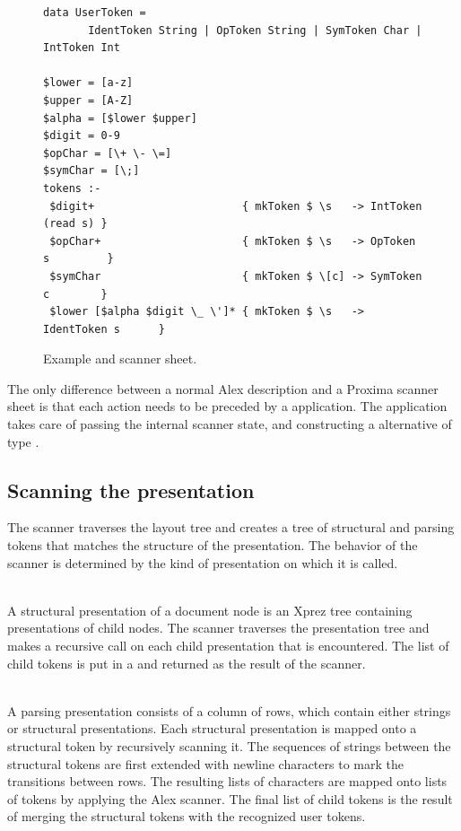 \documentclass[12pt]{article}
\begin{document}
\begin{figure}
\begin{center}
\begin{footnotesize}
\begin{verbatim}
data UserToken =
       IdentToken String | OpToken String | SymToken Char | IntToken Int

$lower = [a-z]
$upper = [A-Z]
$alpha = [$lower $upper]
$digit = 0-9		
$opChar = [\+ \- \=]
$symChar = [\;]
tokens :-
 $digit+                       { mkToken $ \s   -> IntToken (read s) }
 $opChar+                      { mkToken $ \s   -> OpToken s         }
 $symChar                      { mkToken $ \[c] -> SymToken c        }
 $lower [$alpha $digit \_ \']* { mkToken $ \s   -> IdentToken s      }
\end{verbatim}
\end{footnotesize}
\caption{Example  and scanner sheet.} \label{fig:scannerSheet} 
\end{center}
\end{figure}

The only difference between a normal Alex description and a Proxima scanner sheet is that each action needs to be preceded by a  application. The  application takes care of passing the internal scanner state, and constructing a  alternative of type . %



\subsection{Scanning the presentation}

The scanner traverses the layout tree and creates a tree of structural and parsing tokens that matches the structure of the presentation.  The behavior of the scanner is determined by the kind of presentation on which it is called.


 \\
A structural presentation of a document node is an Xprez tree containing presentations of child nodes. The scanner traverses the presentation tree and makes a recursive call on each child presentation that is encountered. The list of child tokens is put in a  and returned as the result of the scanner.

 \\
A parsing presentation consists of a column of rows, which contain either strings or structural presentations. Each structural presentation is mapped onto a structural token by recursively scanning it. The sequences of strings between the structural tokens are first extended with newline characters to mark the transitions between rows. The resulting lists of characters are mapped onto lists of  tokens by applying the Alex scanner. The final list of child tokens is the result of merging the structural tokens with the recognized user tokens.
\end{document}
